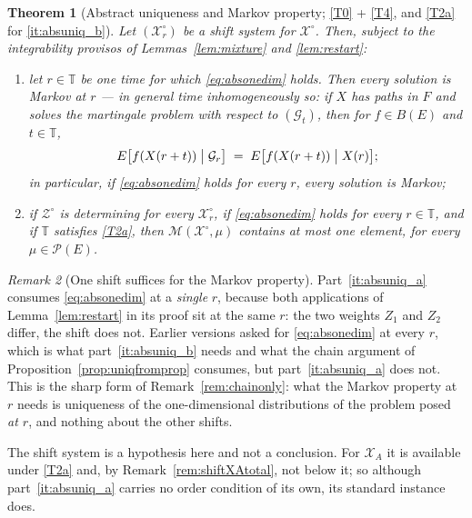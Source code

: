 \documentclass[11pt,a4paper]{article}
\theoremstyle{plain}
\newtheorem{theorem}{Theorem}[section]
\theoremstyle{definition}
\theoremstyle{remark}
\newtheorem{remark}[theorem]{Remark}
\newcommand{\T}{\mathbb{T}}                     %
\newcommand{\Bdd}{B}                           %
\newcommand{\Prob}{\mathcal{P}}                %
\newcommand{\Gilt}{\mathcal{G}}
\newcommand{\XX}{\mathcal{X}}                  %
\newcommand{\ZZ}{\mathcal{Z}}                  %
\newcommand{\Msol}{\mathcal{M}}
\begin{document}
\begin{theorem}[Abstract uniqueness and Markov property; \eqref{T0} + \eqref{T4}, and \eqref{T2a} for \ref{it:absuniq_b}]
  \label{thm:absuniq}
  Let $(\XX^\circ_r)$ be a shift system for $\XX^\circ$.  Then, subject to the
  integrability provisos of Lemmas~\ref{lem:mixture} and \ref{lem:restart}:
  \begin{enumerate}[label=(\alph*)]
  \item \label{it:absuniq_a}
    let $r \in \T$ be \emph{one} time for which \eqref{eq:absonedim} holds.  Then
    every solution is Markov at $r$ --- in general \emph{time inhomogeneously}
    so: if $X$ has paths in $F$ and solves the martingale problem with respect to
    $(\Gilt_t)$, then for $f \in \Bdd(E)$ and $t \in \T$,
    \[
      E\bigl[ f(X(r+t)) \bigm| \Gilt_r \bigr]
        \;=\; E\bigl[ f(X(r+t)) \bigm| X(r) \bigr] ;
    \]
    in particular, if \eqref{eq:absonedim} holds for every $r$, every solution is
    Markov;
  \item \label{it:absuniq_b}
    if $\ZZ^\circ$ is determining for every $\XX^\circ_r$, if
    \eqref{eq:absonedim} holds for every $r \in \T$, and if $\T$ satisfies
    \eqref{T2a}, then $\Msol(\XX^\circ,\mu)$ contains at most one element, for
    every $\mu \in \Prob(E)$.
  \end{enumerate}
\end{theorem}

\begin{remark}[One shift suffices for the Markov property]
  \label{rem:absuniqoner}
  Part~\ref{it:absuniq_a} consumes \eqref{eq:absonedim} at a \emph{single} $r$,
  because both applications of Lemma~\ref{lem:restart} in its proof sit at the
  same $r$: the two weights $Z_1$ and $Z_2$ differ, the shift does not.  Earlier
  versions asked for \eqref{eq:absonedim} at every $r$, which is what
  part~\ref{it:absuniq_b} needs and what the chain argument of
  Proposition~\ref{prop:uniqfromprop} consumes, but part~\ref{it:absuniq_a} does
  not.  This is the sharp form of Remark~\ref{rem:chainonly}: what the Markov
  property at $r$ needs is uniqueness of the one-dimensional distributions of the
  problem posed \emph{at $r$}, and nothing about the other shifts.

  The shift system is a hypothesis here and not a conclusion.  For $\XX_A$ it is
  available under \eqref{T2a} and, by Remark~\ref{rem:shiftXAtotal}, not below
  it; so although part~\ref{it:absuniq_a} carries no order condition of its own,
  its standard instance does.
\end{remark}
\end{document}
